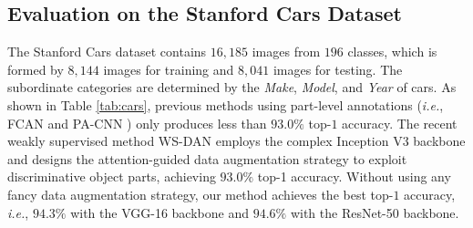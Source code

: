 \documentclass[10pt,twocolumn,letterpaper]{article}
\def\ie{{\em i.e.}}
\begin{document}
\subsection{Evaluation on the Stanford Cars Dataset}
The Stanford Cars dataset \cite{DBLP:conf/iccvw/Krause0DF13} contains $16,185$ images from $196$ classes, which is formed by $8,144$ images for training and $8,041$ images for testing. The subordinate categories are determined by the \textit{Make}, \textit{Model}, and \textit{Year} of cars. As shown in Table \ref{tab:cars}, previous methods using part-level annotations (\ie, FCAN \cite{DBLP:journals/corr/LiuXWL16} and PA-CNN \cite{DBLP:conf/cvpr/KrauseJYL15}) only produces less than $93.0\%$ top-$1$ accuracy. The recent weakly supervised method WS-DAN \cite{DBLP:journals/corr/abs-1901-09891} employs the complex Inception V3 backbone \cite{DBLP:conf/cvpr/SzegedyVISW16} and designs the attention-guided data augmentation strategy to exploit discriminative object parts, achieving $93.0\%$ top-1 accuracy. Without using any fancy data augmentation strategy, our method achieves the best top-$1$ accuracy, \ie, $94.3\%$ with the VGG-16 backbone and $94.6\%$ with the ResNet-50 backbone. 
\end{document}
